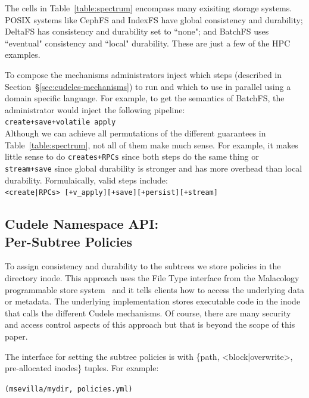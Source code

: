 The cells in Table~\ref{table:spectrum} encompass many exisiting storage
systems. POSIX systems like CephFS and IndexFS have global consistency and
durability; DeltaFS has consistency and durability set to ``none";
and BatchFS uses ``eventual" consistency and ``local" durability. These
are just a few of the HPC examples.  

To compose the mechanisms administrators inject which steps (described in
Section~\S\ref{sec:cudeles-mechanisms}) to run and which to use in parallel
using a domain specific language. For example, to get the semantics of BatchFS,
the administrator would inject the following pipeline:\\

\noindent \texttt{create+save+volatile apply}\\

Although we can achieve all permutations of the different guarantees in
Table~\ref{table:spectrum}, not all of them make much sense. For example, it
makes little sense to do \texttt{creates+RPCs} since both steps do the same
thing or \texttt{stream+save} since global durability is stronger and has
more overhead than local durability.  Formulaically, valid steps
include:\\

\noindent \texttt{<create|RPCs> [+v\_apply][+save][+persist][+stream]}

\subsection{Cudele Namespace API:\\Per-Subtree Policies}

To assign consistency and durability to the subtrees we store policies in
the directory inode. This approach uses the File Type interface from the
Malacology programmable store system~\cite{} and it tells clients how to access
the underlying data or metadata. The underlying implementation stores
executable code in the inode that calls the different Cudele mechanisms. Of
course, there are many security and access control aspects of this approach but
that is beyond the scope of this paper.

The interface for setting the subtree policies is with \{path,
<block|overwrite>, pre-allocated inodes\} tuples. For example:

\texttt{(msevilla/mydir, policies.yml)}

